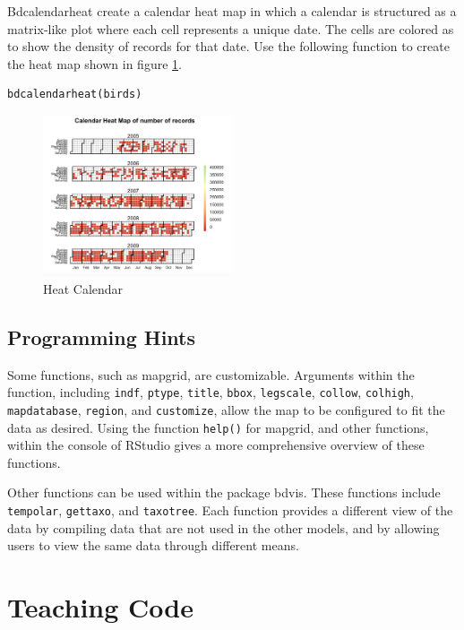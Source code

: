 Bdcalendarheat create a calendar heat map in which a calendar is structured as a matrix-like plot where each cell represents a unique date.
The cells are colored as to show the density of records for that date.
Use the following function to create the heat map shown in figure \ref{fig:heatcal}.

\begin{lstlisting}
bdcalendarheat(birds)
\end{lstlisting}

\begin{figure}[htbp!] 
   \centering
   \includegraphics[width=0.5\textwidth]{pictures/biodiversity/heatmap.jpg} 
      \caption{Heat Calendar}
   \label{fig:heatcal}
\end{figure} 

 \subsection{Programming Hints}
 
 Some functions, such as mapgrid, are customizable.
 Arguments within the function, including \texttt{indf}, \texttt{ptype}, \texttt{title}, \texttt{bbox}, \texttt{legscale}, \texttt{collow}, \texttt{colhigh}, \texttt{mapdatabase}, \texttt{region}, and \texttt{customize}, allow the map to be configured to fit the data as desired.
 Using the function \texttt{help()} for mapgrid, and other functions, within the console of RStudio gives a more comprehensive overview of these functions. 
 
 Other functions can be used within the package bdvis.
 These functions include \texttt{tempolar}, \texttt{gettaxo}, and \texttt{taxotree}.
 Each function provides a different view of the data by compiling data that are not used in the other models, and by allowing users to view the same data through different means.
 

\section{Teaching Code}

